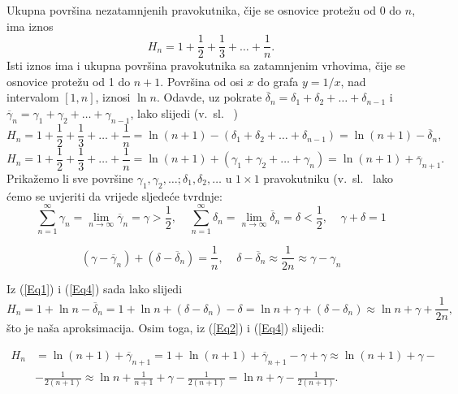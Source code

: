 \documentclass{ppclanak}
\begin{document}
\begin{enumerate}
Ukupna povr\v{s}ina nezatamnjenih pravokutnika, \v{c}ije se
osnovice prote\v{z}u od 0 do $n$, ima iznos
\[ H_n= 1 +\frac{1}{2} +\frac{1}{3}+\ldots + \frac{1}{n}.\]
Isti iznos ima i ukupna povr\v{s}ina pravokutnika sa zatamnjenim
vrhovima, \v{c}ije se osnovice prote\v{z}u od 1 do $n+1$.
Povr\v{s}ina od osi $x$ do grafa $y=1/x$, nad intervalom $[1,n]$,
iznosi $\ln n$. Odavde, uz pokrate $\overline{\delta} _n=\delta _1
+\delta _ 2 + \ldots + \delta _{n-1}$ i $\overline{\gamma}
_n=\gamma _1 +\gamma _ 2 + \ldots + \gamma _{n-1}$, lako slijedi
(v.~sl.~ )
\begin{equation}\label{Eq1}
H_n= 1 +\frac{1}{2} +\frac{1}{3}+\ldots + \frac{1}{n}= \ln{(n+1)}
- (\delta _1 +\delta _ 2 + \ldots + \delta _{n-1})= \ln{(n+1)} -
\overline{\delta} _{n},
\end{equation}
\begin{equation}\label{Eq2}
H_n= 1 +\frac{1}{2} +\frac{1}{3}+\ldots + \frac{1}{n}= \ln{(n+1)}
+ (\gamma _1 +\gamma _ 2 + \ldots + \gamma _{n})= \ln{(n+1)} +
\overline{\gamma} _{n+1}.
\end{equation}
Prika\v{z}emo li sve povr\v{s}ine $\gamma _1, \gamma _2,\ldots ;
\delta _1, \delta _2 ,\ldots$ u $1\times 1$ pravokutniku
(v.~sl.~ lako \'{c}emo se uvjeriti da
vrijede sljede\'{c}e tvrdnje: 
\begin{equation}\label{Eq3}
\sum _{n=1}^{\infty} \gamma _n = \lim _{n \rightarrow\infty}
{\overline{\gamma} _n} =\gamma > \frac{1}{2}, \;\;\;\; \sum
_{n=1}^{\infty} \delta _n = \lim _{n \rightarrow\infty}
{\overline{\delta} _n} =\delta < \frac{1}{2}, \;\;\;\; \gamma +
\delta = 1
\end{equation}

\begin{equation}\label{Eq4}
(\gamma -\overline\gamma _n ) + (\delta - \overline\delta _ n) =
\frac{1}{n}, \;\;\;\; \delta - \overline\delta _n
\approx\frac{1}{2n} \approx\gamma -\gamma _n
\end{equation}

Iz (\ref{Eq1}) i (\ref{Eq4}) sada lako slijedi
\begin{equation*}
H_n= 1+ \ln n -\overline\delta _n = 1+ \ln n + (\delta -\delta _n)
-\delta = \ln n + \gamma + (\delta - \delta _n)\approx \ln n +
\gamma + \frac{1}{2n} ,
\end{equation*}
\v{s}to je na\v{s}a aproksimacija. Osim toga, iz (\ref{Eq2}) i
(\ref{Eq4}) slijedi:

\begin{equation*}
\begin{split}
H_n &=\ln{(n+1)} +\overline\gamma _{n+1} = 1+ \ln{(n+1)}
+\overline\gamma _{n+1} -\gamma + \gamma \approx \ln{(n+1)} +
\gamma
-\\
& - \frac{1}{2(n+1)}\approx \ln{n} + \frac{1}{n+1} + \gamma -
\frac{1}{2(n+1)} = \ln n +\gamma -\frac{1}{2(n+1)}.
\end{split}
\end{equation*}


\end{enumerate}
\end{document}
